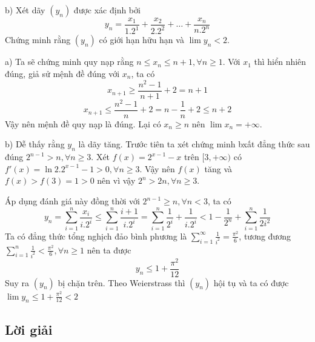 \documentclass[11pt]{scrartcl}
\begin{document}
\begin{itemize}[label=, leftmargin=0em, itemsep=0.5em]
\begin{bt}
        b) Xét dãy $(y_n)$ được xác định bởi
        \[y_n = \frac{x_1}{1.2^1} + \frac{x_2}{2.2^2} + \dots + \frac{x_n}{n.2^n}\]
        Chứng minh rằng $(y_n)$ có giới hạn hữu hạn và $\lim y_n < 2$.
        
    \end{bt}

    \begin{sol}
        a) Ta sẽ chứng minh quy nạp rằng $n \leq x_n \leq n + 1, \forall n \geq 1$. Với $x_1$ thì hiển nhiên đúng, giả sử mệnh đề đúng với $x_n$, ta có 
        \[x_{n + 1} \geq \frac{n^2 - 1}{n + 1} + 2 = n + 1\]
        \[x_{n + 1} \leq \frac{n^2 - 1}{n} + 2 = n - \frac{1}{n} +2 \leq n + 2\]
        Vậy nên mệnh đề quy nạp là đúng. Lại có $x_n \geq n$ nên $\lim x_n = +\infty$.


        b) Dễ thấy rằng $y_n$ là dãy tăng. Trước tiên ta xét chứng minh bxất đẳng thức sau đúng $ 2^{n - 1} > n, \forall n \geq 3$. Xét $f(x) = 2^{x - 1} - x$ trên $[3,+\infty)$ có $f'(x) = \ln2.2^{x - 1} - 1 > 0, \forall n \geq 3$. Vậy nên $f(x)$ tăng và $f(x) > f(3) = 1 > 0$ nên vì vậy $2^n > 2n, \forall n \geq 3$.
        
        
        Áp dụng đánh giá này đồng thời với $ 2^{n - 1} \geq n, \forall n < 3$, ta có 
        $$
        y_n = \sum_{i = 1}^n \frac{x_i}{i.2^i} \leq \sum_{i = 1}^n \frac{i + 1}{i.2^i} = 
        \sum_{i = 1}^n \frac{1}{2^i} + \frac{1}{i.2^i} < 1 - \frac{1}{2^{n}}+ \sum_{i = 1}^n \frac{1}{2i^2}
        $$
        Ta có đẳng thức tổng nghịch đảo bình phương là $\displaystyle \sum_{i = 1}^{\infty} \frac{1}{i^2} = \frac{\pi^2}{6}$, tương đương $\displaystyle \sum_{i = 1}^{n} \frac{1}{i^2} < \frac{\pi^2}{6}, \forall n \geq 1$ nên ta được
        \[y_n \leq 1 + \frac{\pi^2}{12} \]
        Suy ra $(y_n)$ bị chặn trên. Theo Weierstrass thì $(y_n)$ hội tụ và ta có được $\lim y_n \leq 1 + \frac{\pi^2}{12} < 2$
    \end{sol}


 
        
        \subsection{\LARGE \textcolor{dk}{Lời giải}}
    \newpage

\end{itemize}
\end{document}
